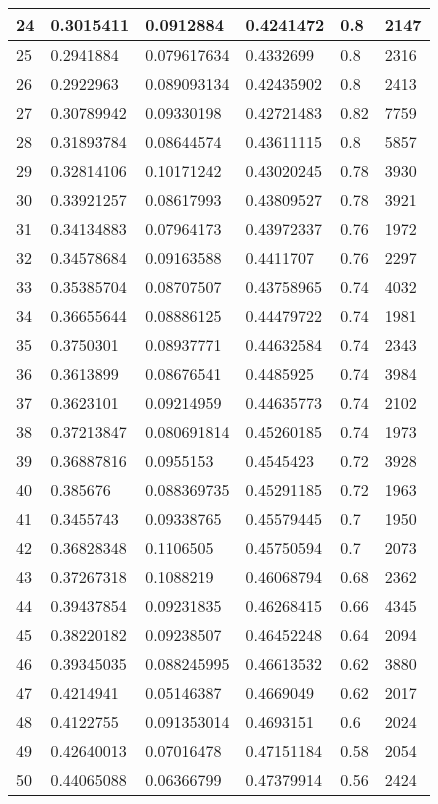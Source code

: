 \begin{longtable}{|l|l|l|l|l|l|}
24 & 0.3015411 & 0.0912884 & 0.4241472 & 0.8 & 2147 \\ \hline 
25 & 0.2941884 & 0.079617634 & 0.4332699 & 0.8 & 2316 \\ \hline 
26 & 0.2922963 & 0.089093134 & 0.42435902 & 0.8 & 2413 \\ \hline 
27 & 0.30789942 & 0.09330198 & 0.42721483 & 0.82 & 7759 \\ \hline 
28 & 0.31893784 & 0.08644574 & 0.43611115 & 0.8 & 5857 \\ \hline 
29 & 0.32814106 & 0.10171242 & 0.43020245 & 0.78 & 3930 \\ \hline 
30 & 0.33921257 & 0.08617993 & 0.43809527 & 0.78 & 3921 \\ \hline 
31 & 0.34134883 & 0.07964173 & 0.43972337 & 0.76 & 1972 \\ \hline 
32 & 0.34578684 & 0.09163588 & 0.4411707 & 0.76 & 2297 \\ \hline 
33 & 0.35385704 & 0.08707507 & 0.43758965 & 0.74 & 4032 \\ \hline 
34 & 0.36655644 & 0.08886125 & 0.44479722 & 0.74 & 1981 \\ \hline 
35 & 0.3750301 & 0.08937771 & 0.44632584 & 0.74 & 2343 \\ \hline 
36 & 0.3613899 & 0.08676541 & 0.4485925 & 0.74 & 3984 \\ \hline 
37 & 0.3623101 & 0.09214959 & 0.44635773 & 0.74 & 2102 \\ \hline 
38 & 0.37213847 & 0.080691814 & 0.45260185 & 0.74 & 1973 \\ \hline 
39 & 0.36887816 & 0.0955153 & 0.4545423 & 0.72 & 3928 \\ \hline 
40 & 0.385676 & 0.088369735 & 0.45291185 & 0.72 & 1963 \\ \hline 
41 & 0.3455743 & 0.09338765 & 0.45579445 & 0.7 & 1950 \\ \hline 
42 & 0.36828348 & 0.1106505 & 0.45750594 & 0.7 & 2073 \\ \hline 
43 & 0.37267318 & 0.1088219 & 0.46068794 & 0.68 & 2362 \\ \hline 
44 & 0.39437854 & 0.09231835 & 0.46268415 & 0.66 & 4345 \\ \hline 
45 & 0.38220182 & 0.09238507 & 0.46452248 & 0.64 & 2094 \\ \hline 
46 & 0.39345035 & 0.088245995 & 0.46613532 & 0.62 & 3880 \\ \hline 
47 & 0.4214941 & 0.05146387 & 0.4669049 & 0.62 & 2017 \\ \hline 
48 & 0.4122755 & 0.091353014 & 0.4693151 & 0.6 & 2024 \\ \hline 
49 & 0.42640013 & 0.07016478 & 0.47151184 & 0.58 & 2054 \\ \hline 
50 & 0.44065088 & 0.06366799 & 0.47379914 & 0.56 & 2424 \\ \hline 
\end{longtable}